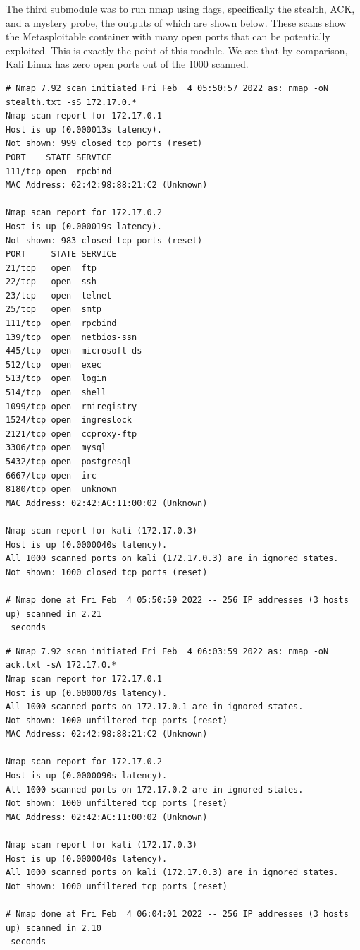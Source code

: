\documentclass[12pt]{article}
\renewcommand{\footnotesize}{\fontsize{8pt}{10pt}\selectfont}
\begin{document}
The third submodule was to run nmap using flags, specifically the stealth, ACK, and a mystery probe, the outputs of which are shown below. These scans show the Metasploitable container with many open ports that can be potentially exploited. This is exactly the point of this module. We see that by comparison, Kali Linux has zero open ports out of the 1000 scanned.

\begin{tcolorbox}[colback=CrispBlue!5!white,colframe=CrispBlue!75!black,title=Output of \texttt{nmap -oN stealth.txt -sS 172.17.0.*}]\footnotesize
\begin{verbatim}
# Nmap 7.92 scan initiated Fri Feb  4 05:50:57 2022 as: nmap -oN stealth.txt -sS 172.17.0.*
Nmap scan report for 172.17.0.1
Host is up (0.000013s latency).
Not shown: 999 closed tcp ports (reset)
PORT    STATE SERVICE
111/tcp open  rpcbind
MAC Address: 02:42:98:88:21:C2 (Unknown)

Nmap scan report for 172.17.0.2
Host is up (0.000019s latency).
Not shown: 983 closed tcp ports (reset)
PORT     STATE SERVICE
21/tcp   open  ftp
22/tcp   open  ssh
23/tcp   open  telnet
25/tcp   open  smtp
111/tcp  open  rpcbind
139/tcp  open  netbios-ssn
445/tcp  open  microsoft-ds
512/tcp  open  exec
513/tcp  open  login
514/tcp  open  shell
1099/tcp open  rmiregistry
1524/tcp open  ingreslock
2121/tcp open  ccproxy-ftp
3306/tcp open  mysql
5432/tcp open  postgresql
6667/tcp open  irc
8180/tcp open  unknown
MAC Address: 02:42:AC:11:00:02 (Unknown)

Nmap scan report for kali (172.17.0.3)
Host is up (0.0000040s latency).
All 1000 scanned ports on kali (172.17.0.3) are in ignored states.
Not shown: 1000 closed tcp ports (reset)

# Nmap done at Fri Feb  4 05:50:59 2022 -- 256 IP addresses (3 hosts up) scanned in 2.21
 seconds
\end{verbatim}
\end{tcolorbox}

\begin{tcolorbox}[colback=CrispBlue!5!white,colframe=CrispBlue!75!black,title=Output of \texttt{nmap -oN ack.txt -sA 172.17.0.*}]\footnotesize
\begin{verbatim}
# Nmap 7.92 scan initiated Fri Feb  4 06:03:59 2022 as: nmap -oN ack.txt -sA 172.17.0.*
Nmap scan report for 172.17.0.1
Host is up (0.0000070s latency).
All 1000 scanned ports on 172.17.0.1 are in ignored states.
Not shown: 1000 unfiltered tcp ports (reset)
MAC Address: 02:42:98:88:21:C2 (Unknown)

Nmap scan report for 172.17.0.2
Host is up (0.0000090s latency).
All 1000 scanned ports on 172.17.0.2 are in ignored states.
Not shown: 1000 unfiltered tcp ports (reset)
MAC Address: 02:42:AC:11:00:02 (Unknown)

Nmap scan report for kali (172.17.0.3)
Host is up (0.0000040s latency).
All 1000 scanned ports on kali (172.17.0.3) are in ignored states.
Not shown: 1000 unfiltered tcp ports (reset)

# Nmap done at Fri Feb  4 06:04:01 2022 -- 256 IP addresses (3 hosts up) scanned in 2.10
 seconds
\end{verbatim}
\end{tcolorbox}
\end{document}
